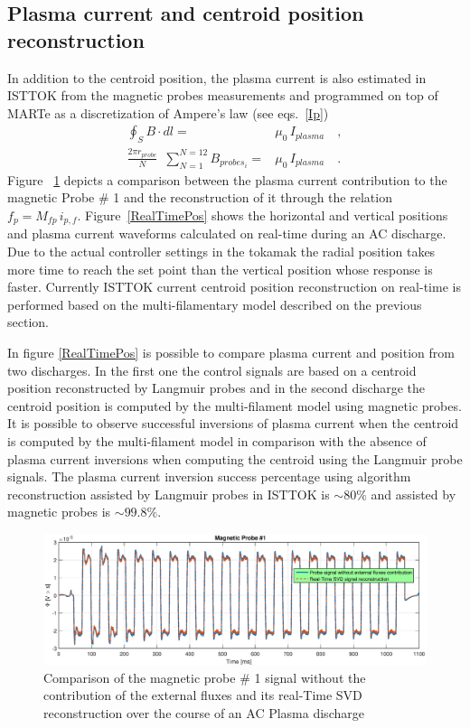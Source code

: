 \subsection{Plasma current and  centroid position reconstruction}

In addition to the centroid position, the plasma current is also estimated in ISTTOK from the magnetic probes measurements and  programmed on top of MARTe as a discretization of Ampere's law (see eqs.~\ref{Ip})
\begin{subequations}
	\label{Ip}
	\begin{align}
	\oint_S{B \cdot dl}=&\mu_0 \,I_{plasma} \quad ,
	\\[5pt]
	\frac{2\pi r_{probe}}{N} \enspace \sum^{N=12}_{N=1} B_{probes_i}  =&\mu_0 \,I_{plasma} \quad .
	\end{align}
\end{subequations}
Figure ~\ref{mirnv1} depicts a comparison between the plasma current contribution to the magnetic Probe \# 1 and the reconstruction of it through the relation $ f_p=M_{fp}\,i_{p,f}$. Figure~\ref{RealTimePos} shows the horizontal and vertical positions and plasma current waveforms calculated on real-time during an AC  discharge. Due to the actual controller settings in the tokamak the radial position takes more time to reach the set point than the vertical position whose response is faster. Currently ISTTOK current centroid position reconstruction on real-time is performed based on the multi-filamentary model described on the previous section. \smallskip

In figure \ref{RealTimePos} is possible to compare  plasma current and position from two discharges. In the first one the control signals are based on a  centroid position reconstructed by Langmuir probes and in the second discharge the centroid  position is computed by the multi-filament model using magnetic probes. It is possible to observe  successful inversions of plasma current when the centroid is computed by the multi-filament model in comparison with the absence of plasma current inversions when computing the centroid using the Langmuir probe signals. The plasma current inversion success percentage using algorithm reconstruction assisted by  Langmuir probes in ISTTOK is $\sim 80\%$  and assisted by magnetic probes is $\sim 99.8\%$. \smallskip
\begin{figure}[h]
	\centering
	\includegraphics[width=1.1\textwidth]{Chp4/Mirnv1_comparsion.eps}
	\caption{\label{mirnv1} Comparison of the magnetic probe \# 1 signal without the contribution of the external fluxes and its real-Time SVD reconstruction over the course of an AC Plasma discharge }
\end{figure}




